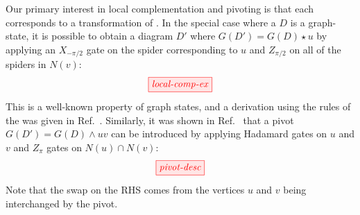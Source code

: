 \documentclass[a4paper,onecolumn,superscriptaddress,11pt,accepted=2020-04-27]{quantumarticle}
\newcommand{\UG}[1]{\ensuremath{G(#1)}\xspace}
\newcommand{\ket}[1]{\ensuremath{\left|  #1 \right\rangle}}
\theoremstyle{definition}
\newtheorem{remark}[theorem]{Remark}
\newcommand{\NOTEj}[1]{\marginpar{\footnotesize {\color{purple} \noindent\textbf{j:} #1}}}
\begin{document}
Our primary interest in local complementation and pivoting is that each corresponds to a transformation of \zxdiagrams. In the special case where a \zxdiagram $D$ is a graph-state, it is possible to obtain a diagram $D'$ where $\UG{D'} = \UG{D} \star u$ by applying an $X_{-\pi/2}$ gate on the spider corresponding to $u$ and $Z_{\pi/2}$ on all of the spiders in $N(v)$:
\begin{equation}\label{eq:gs-local-comp}
\tikzfig{local-comp-ex}
\end{equation}
This is a well-known property of graph states, and a derivation using the rules of the \zxcalculus was given in Ref.~\cite{DP1}. Similarly, it was shown in Ref.~\cite{DP3} that a pivot $\UG{D'} = \UG{D} \wedge uv$ can be introduced by applying Hadamard gates on $u$ and $v$ and $Z_{\pi}$ gates on $N(u) \cap N(v)$:
\begin{equation}\label{eq:gs-pivot}
\tikzfig{pivot-desc}
\end{equation}
Note that the swap on the RHS comes from the vertices $u$ and $v$ being interchanged by the pivot.




\end{document}
